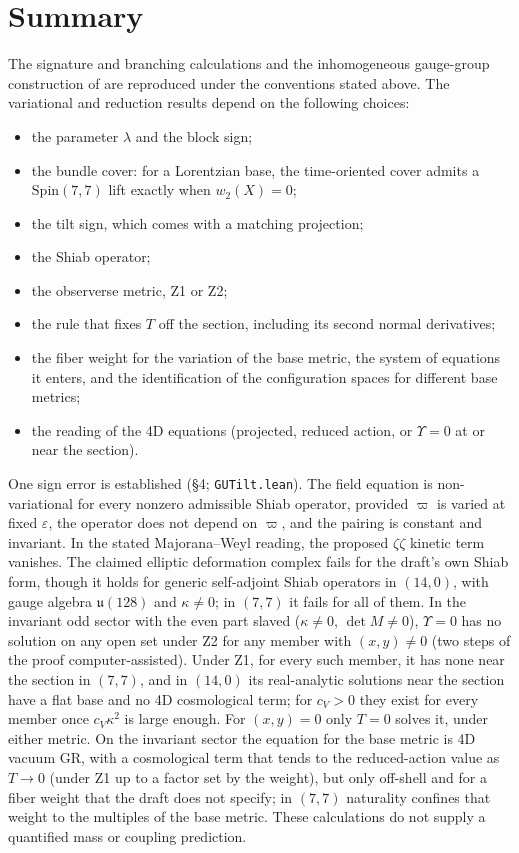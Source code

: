 \documentclass[11pt]{article}
\theoremstyle{remark}
\begin{document}
\section{Summary}
The signature and branching calculations and the inhomogeneous gauge-group construction of \cite{W21} are reproduced under the conventions stated above. The variational and reduction results depend on the following choices:
\begin{itemize}
\item the parameter $\lambda$ and the block sign;
\item the bundle cover: for a Lorentzian base, the time-oriented cover admits a $\mathrm{Spin}(7,7)$ lift exactly when $w_2(X)=0$;
\item the tilt sign, which comes with a matching projection;
\item the Shiab operator;
\item the observerse metric, Z1 or Z2;
\item the rule that fixes $T$ off the section, including its second normal derivatives;
\item the fiber weight for the variation of the base metric, the system of equations it enters, and the identification of the configuration spaces for different base metrics;
\item the reading of the 4D equations (projected, reduced action, or $\Upsilon=0$ at or near the section).
\end{itemize}
One sign error is established (\S4; \texttt{GUTilt.lean}). The field equation is non-variational for every nonzero admissible Shiab operator, provided $\varpi$ is varied at fixed $\varepsilon$, the operator does not depend on $\varpi$, and the pairing is constant and invariant. In the stated Majorana--Weyl reading, the proposed $\zeta\zeta$ kinetic term vanishes. The claimed elliptic deformation complex fails for the draft's own Shiab form, though it holds for generic self-adjoint Shiab operators in $(14,0)$, with gauge algebra $\mathfrak u(128)$ and $\kappa\neq0$; in $(7,7)$ it fails for all of them. In the invariant odd sector with the even part slaved ($\kappa\neq0$, $\det M\neq0$), $\Upsilon=0$ has no solution on any open set under Z2 for any member with $(x,y)\neq0$ (two steps of the proof computer-assisted). Under Z1, for every such member, it has none near the section in $(7,7)$, and in $(14,0)$ its real-analytic solutions near the section have a flat base and no 4D cosmological term; for $c_V>0$ they exist for every member once $c_V\kappa^2$ is large enough. For $(x,y)=0$ only $T=0$ solves it, under either metric. On the invariant sector the equation for the base metric is 4D vacuum GR, with a cosmological term that tends to the reduced-action value as $T\to0$ (under Z1 up to a factor set by the weight), but only off-shell and for a fiber weight that the draft does not specify; in $(7,7)$ naturality confines that weight to the multiples of the base metric. These calculations do not supply a quantified mass or coupling prediction.
\end{document}
